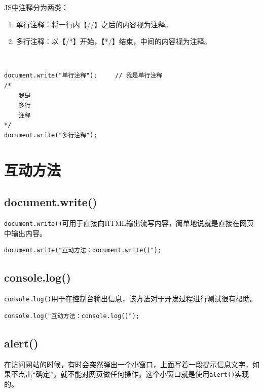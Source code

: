 JS中注释分为两类：

\begin{enumerate}
	\item 单行注释：将一行内【//】之后的内容视为注释。
	\item 多行注释：以【/*】开始，【*/】结束，中间的内容视为注释。
\end{enumerate}

 \\

\begin{lstlisting}[style=htmlcssjs]
document.write("单行注释");     // 我是单行注释
/*
    我是
    多行
    注释
*/
document.write("多行注释");
\end{lstlisting}

\newpage

\section{互动方法}

\subsection{document.write()}

\lstinline|document.write()|可用于直接向HTML输出流写内容，简单地说就是直接在网页中输出内容。 \\

\begin{lstlisting}[style=htmlcssjs]
document.write("互动方法：document.write()");
\end{lstlisting}

\subsection{console.log()}

\lstinline|console.log()|用于在控制台输出信息，该方法对于开发过程进行测试很有帮助。 \\

\begin{lstlisting}[style=htmlcssjs]
console.log("互动方法：console.log()");
\end{lstlisting}

\subsection{alert()}

在访问网站的时候，有时会突然弹出一个小窗口，上面写着一段提示信息文字，如果不点击“确定”，就不能对网页做任何操作，这个小窗口就是使用\lstinline|alert()|实现的。 \\


